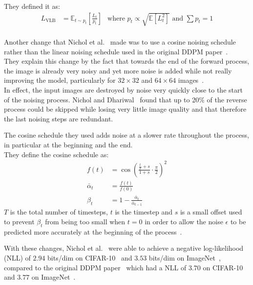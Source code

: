 \documentclass[twoside]{article}
\numberwithin{equation}{section}
\numberwithin{figure}{section}
\begin{document}
They defined it as:
\begin{align}
  L_{\text{VLB}} &= \mathbb{E}_{t \sim p_t} \left[ \frac{L_t}{p_t} \right]
  &\text{where } p_t \propto \sqrt{\mathbb{E}\left[ L_t^2 \right]} \text{ and } \sum p_t = 1
\end{align}
\\
Another change that Nichol et al.~\cite{nichol2021improved} made was to use a cosine noising schedule rather than the linear noising schedule used in the original DDPM paper~\cite{ho2020denoising}. \\
They explain this change by the fact that towards the end of the forward process, the image is already very noisy and yet more noise is added while not really improving the model, particularly for $32 \times 32$ and $64 \times 64$ images~\cite{nichol2021improved}. \\
In effect, the input images are destroyed by noise very quickly close to the start of the noising process. Nichol and Dhariwal~\cite{nichol2021improved} found that up to 20\% of the reverse process could be skipped while losing very little image quality and that therefore the last noising steps are redundant. 

The cosine schedule they used adds noise at a slower rate throughout the process, in particular at the beginning and the end. \\
They define the cosine schedule as:
\begin{align}
  f(t) &= \cos \left( \frac{\frac{t}{T} + s}{1 + s} \cdot \frac{\pi}{2} \right)^2 \\
  \bar{\alpha}_t &= \frac{f(t)}{f(0)} \\
  \beta_t &= 1 - \frac{\bar{\alpha}_t}{\bar{\alpha}_{t-1}}
\end{align}
$T$ is the total number of timesteps, $t$ is the timestep and $s$ is a small offset used to prevent $\beta_t$ from being too small when $t = 0$ in order to allow the noise $\epsilon$ to be predicted more accurately at the beginning of the process~\cite{nichol2021improved}.

With these changes, Nichol et al.~\cite{nichol2021improved} were able to achieve a negative log-likelihood (NLL) of $2.94$ bits/dim on CIFAR-10~\cite{cifar10} and $3.53$ bits/dim on ImageNet~\cite{oord2016conditional}, compared to the original DDPM paper~\cite{ho2020denoising} which had a NLL of $3.70$ on CIFAR-10 and $3.77$ on ImageNet~\cite{nichol2021improved}.
\end{document}
